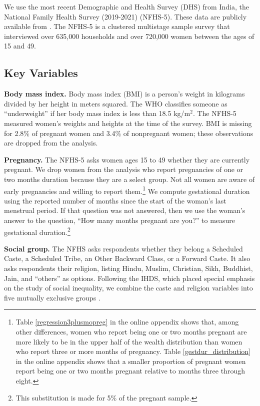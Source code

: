 \documentclass[12pt]{article}
\begin{document}
We use the most recent Demographic and Health Survey (DHS) from India, the National Family Health Survey (2019-2021) (NFHS-5). These data are publicly available from .  The NFHS-5 is a clustered multistage sample survey that interviewed over 635,000 households and over 720,000 women between the ages of 15 and 49. 

\subsection{Key Variables}

{\bf{Body mass index.}} Body mass index (BMI) is a person's weight in kilograms divided by her height in meters squared.  The WHO classifies someone as ``underweight'' if her body mass index is less than 18.5 kg/m$^2$.  The NFHS-5 measured women's weights and heights at the time of the survey.  BMI is missing for 2.8\% of pregnant women and 3.4\% of nonpregnant women; these observations are dropped from the analysis.

{\bf{Pregnancy.}}  The NFHS-5 asks women ages 15 to 49 whether they are currently pregnant.  We drop women from the analysis who report pregnancies of one or two months duration because they are a select group.  Not all women are aware of early pregnancies and willing to report them.\footnote{Table \ref{regression3plusmopreg} in the online appendix shows that, among other differences, women who report being one or two months pregnant are more likely to be in the upper half of the wealth distribution than women who report three or more months of pregnancy. Table \ref{gestdur_distribution} in the online appendix shows that a smaller proportion of pregnant women report being one or two months pregnant relative to months three through eight.}  We compute gestational duration using the reported number of months since the start of the woman's last menstrual period.  If that question was not answered, then we use the woman's answer to the question, ``How many months pregnant are you?'' to measure gestational duration.\footnote{This substitution is made for 5\% of the pregnant sample.}  

{\bf{Social group.}} The NFHS asks respondents whether they belong a Scheduled Caste, a Scheduled Tribe, an Other Backward Class, or a Forward Caste.  It also asks respondents their religion, listing Hindu, Muslim, Christian, Sikh, Buddhist, Jain, and ``others'' as options. Following the IHDS, which placed special emphasis on the study of social inequality, we combine the caste and religion variables into five mutually exclusive groups \citep{IHDS2005}.  
\end{document}
